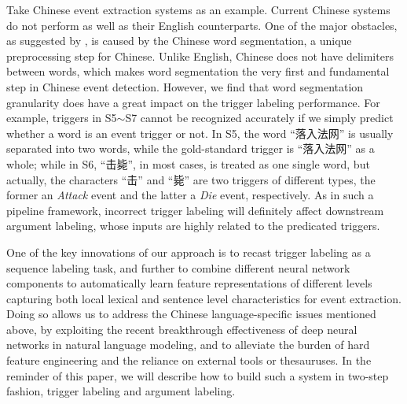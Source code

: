 Take Chinese event extraction systems as an example. Current Chinese systems do not perform as well as their English counterparts. One of the major obstacles, as suggested by , is caused by the Chinese word segmentation, a unique preprocessing step for Chinese. Unlike English, Chinese does not have delimiters between words, which makes word segmentation the very first and fundamental step in Chinese event detection. However, we find that word segmentation granularity does have a great impact on the trigger labeling performance. For example, triggers in S5$\sim$S7 cannot be recognized accurately if we simply predict whether a word is an event trigger or not. In S5, the word ``落入法网'' is usually separated into two words, while the gold-standard trigger is ``落入法网'' as a whole; while in S6, ``击毙'', in most cases, is treated as one single word, but actually, the characters ``击'' and ``毙'' are two triggers of different types, the former an \textit{Attack} event and the latter a \textit{Die} event, respectively. As in such a pipeline framework, incorrect trigger labeling will definitely affect downstream argument labeling, whose inputs are highly related to the predicated triggers.

One of the key innovations of our approach is to recast trigger labeling as a sequence labeling task, and further to combine different neural network components to automatically learn feature representations of different levels capturing both local lexical and sentence level characteristics for event extraction. Doing so allows us to  address the Chinese language-specific issues mentioned above, by exploiting the recent breakthrough effectiveness of deep neural networks in natural language modeling, and to alleviate the burden of hard feature engineering and the reliance on external tools or thesauruses. In the reminder of this paper, we will describe how to build such a system in two-step fashion, trigger labeling and argument labeling.

